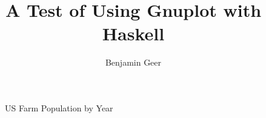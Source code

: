 \documentclass[a4paper]{article}
\title{A Test of Using Gnuplot with Haskell}
\author{Benjamin Geer}
\begin{document}
\maketitle

\begin{figure}[h]

\caption{US Farm Population by Year}
\label{fig:farm}
\end{figure}
\end{document}
